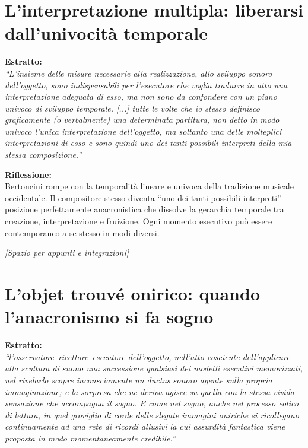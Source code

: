 \documentclass[12pt,a4paper]{article}
\begin{document}
\section{L'interpretazione multipla: liberarsi dall'univocità temporale}

\begin{estratto}
\textbf{Estratto:} \\
\textit{``L'insieme delle misure necessarie alla realizzazione, allo sviluppo sonoro dell'oggetto, sono indispensabili per l'esecutore che voglia tradurre in atto una interpretazione adeguata di esso, ma non sono da confondere con un piano univoco di sviluppo temporale. [...] tutte le volte che io stesso definisco graficamente (o verbalmente) una determinata partitura, non detto in modo univoco l'unica interpretazione dell'oggetto, ma soltanto una delle molteplici interpretazioni di esso e sono quindi uno dei tanti possibili interpreti della mia stessa composizione.''}
\end{estratto}

\begin{riflessione}
\textbf{Riflessione:} \\
Bertoncini rompe con la temporalità lineare e univoca della tradizione musicale occidentale. Il compositore stesso diventa ``uno dei tanti possibili interpreti'' - posizione perfettamente anacronistica che dissolve la gerarchia temporale tra creazione, interpretazione e fruizione. Ogni momento esecutivo può essere contemporaneo a se stesso in modi diversi.

\vspace{0.5cm}
\textit{[Spazio per appunti e integrazioni]}
\vspace{1cm}
\end{riflessione}

\section{L'objet trouvé onirico: quando l'anacronismo si fa sogno}

\begin{estratto}
\textbf{Estratto:} \\
\textit{``l'osservatore–ricettore–esecutore dell'oggetto, nell'atto cosciente dell'applicare alla scultura di suono una successione qualsiasi dei modelli esecutivi memorizzati, nel rivelarlo scopre inconsciamente un ductus sonoro agente sulla propria immaginazione; e la sorpresa che ne deriva agisce su quella con la stessa vivida sensazione che accompagna il sogno. E come nel sogno, anche nel processo eolico di lettura, in quel groviglio di corde delle slegate immagini oniriche si ricollegano continuamente ad una rete di ricordi allusivi la cui assurdità fantastica viene proposta in modo momentaneamente credibile.''}
\end{estratto}
\end{document}
